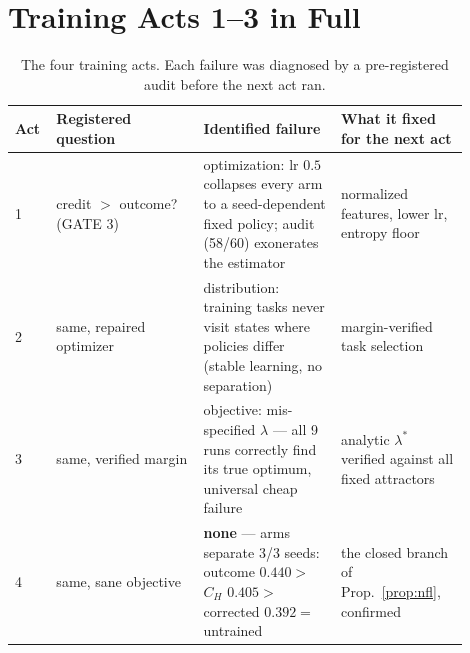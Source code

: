 \documentclass{article}
\theoremstyle{remark}
\begin{document}
\section{Training Acts 1--3 in Full}
\label{app:acts}
\begin{table}[h]
\centering\scriptsize
\begin{tabular}{p{0.06\linewidth}p{0.30\linewidth}p{0.28\linewidth}p{0.26\linewidth}}
\toprule
Act & Registered question & Identified failure & What it fixed for the next act \\
\midrule
1 & credit $>$ outcome? (GATE 3) & optimization: lr $0.5$ collapses every arm to a seed-dependent fixed policy; audit (58/60) exonerates the estimator & normalized features, lower lr, entropy floor \\
2 & same, repaired optimizer & distribution: training tasks never visit states where policies differ (stable learning, no separation) & margin-verified task selection \\
3 & same, verified margin & objective: mis-specified $\lambda$ --- all 9 runs correctly find its true optimum, universal cheap failure & analytic $\lambda^{*}$ verified against all fixed attractors \\
4 & same, sane objective & \textbf{none} --- arms separate 3/3 seeds: outcome $0.440 >$ $C_H$ $0.405 >$ corrected $0.392 =$ untrained & the closed branch of Prop.~\ref{prop:nfl}, confirmed \\
\bottomrule
\end{tabular}
\caption{The four training acts. Each failure was diagnosed by a
pre-registered audit before the next act ran.}
\label{tab:acts}
\end{table}
\end{document}
